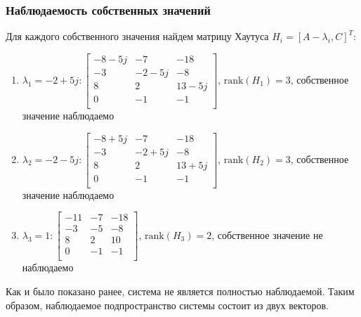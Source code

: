 \subsubsection{Наблюдаемость собственных значений}
Для каждого собственного значения найдем матрицу Хаутуса $H_i = [A - \lambda_i, C]^T$:
\begin{enumerate}
    \item $\lambda_1 = -2 + 5j: \begin{bmatrix}
        -8 - 5j  & -7  & -18 \\ 
        -3  & -2 - 5j  & -8 \\ 
        8  & 2  & 13 - 5j \\ 
        0  & -1  & -1 \\ 
        \end{bmatrix} $, $\text{rank}(H_1) = 3$, собственное значение наблюдаемо

    \item $\lambda_2 = -2 - 5j: \begin{bmatrix}
        -8 + 5j  & -7  & -18 \\ 
        -3  & -2 + 5j  & -8 \\ 
        8  & 2  & 13 + 5j \\ 
        0  & -1  & -1 \\ 
    \end{bmatrix}$, $\text{rank}(H_2) = 3$, собственное значение наблюдаемо

    \item $\lambda_3 = 1: \begin{bmatrix}
        -11  & -7  & -18 \\ 
        -3  & -5  & -8 \\ 
        8  & 2  & 10 \\ 
        0  & -1  & -1 \\ 
    \end{bmatrix}$, $\text{rank}(H_3) = 2$, собственное значение не наблюдаемо
    
\end{enumerate}

Как и было показано ранее, система не является полностью наблюдаемой. Таким образом, наблюдаемое подпространство системы состоит из двух векторов.

